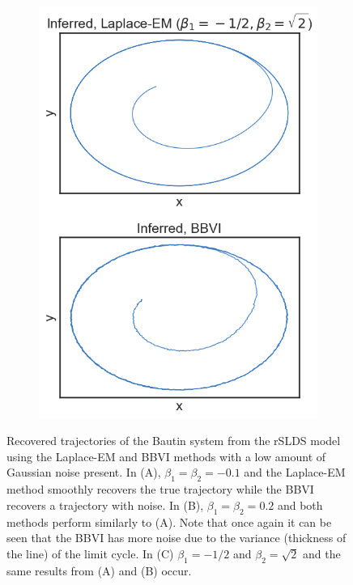 \begin{figure}
\begin{subfigure}[b]{0.33\linewidth}
        \includegraphics[width=\linewidth]{./Figures/bautin-lpc.png}
        \caption{}
        \label{bautinresults:c}
        \vspace{4ex}
    \end{subfigure}
    \caption{Recovered trajectories of the Bautin system from the rSLDS model using the Laplace-EM and BBVI methods with a low amount of Gaussian noise present. In (A), $\beta_1 = \beta_2 = -0.1$ and the Laplace-EM method smoothly recovers the true trajectory while the BBVI recovers a trajectory with noise. In (B), $\beta_1 = \beta_2 = 0.2$ and both methods perform similarly to (A). Note that once again it can be seen that the BBVI has more noise due to the variance (thickness of the line) of the limit cycle. In (C) $\beta_1 = -1/2$ and $\beta_2 = \sqrt{2}$ and the same results from (A) and (B) occur.}
    \label{bautinresults}
\end{figure}